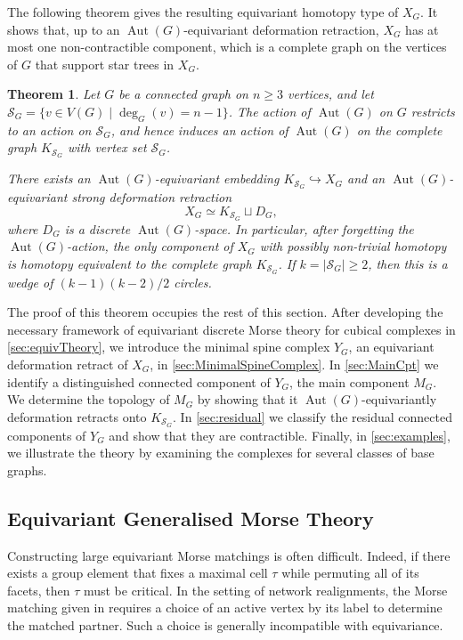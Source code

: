 \documentclass[reqno,dvipsnames]{amsart}
\newtheorem{theorem}{Theorem}[section]
\theoremstyle{plain}
\numberwithin{equation}{section}
\theoremstyle{definition}
\DeclareMathOperator{\Aut}{Aut}
\begin{document}
The following theorem gives the resulting equivariant homotopy type of $X_G$. It shows that, up to an $\Aut(G)$-equivariant deformation retraction, $X_G$ has at most one non-contractible component, which is a complete graph on the vertices of $G$ that support star trees in $X_G$.

\begin{theorem} 
	Let $G$ be a connected graph on $n\geq 3$ vertices, and let $\mathcal S_G=\{v\in V(G) \mid \deg_G(v)=n-1\}$. The action of $\Aut(G)$ on $G$ restricts to an action on $\mathcal S_G$, and hence induces an action of $\Aut(G)$ on the complete graph $K_{\mathcal S_G}$ with vertex set $\mathcal S_G$. 
	
	There exists an $\Aut(G)$-equivariant embedding $K_{\mathcal S_G}\hookrightarrow X_G$ and an $\Aut(G)$-equivariant strong deformation retraction 
	\[
	X_G \simeq K_{\mathcal S_G} \sqcup D_G, 
	\]
	where $D_G$ is a discrete $\Aut(G)$-space. In particular, after forgetting the $\Aut(G)$-action, the only component of $X_G$ with possibly non-trivial homotopy is homotopy equivalent to the complete graph $K_{\mathcal S_G}$. If $k=|\mathcal S_G|\geq 2$, then this is a wedge of $(k-1)(k-2)/2$ circles.
\end{theorem}

The proof of this theorem occupies the rest of this section. After developing the necessary framework of equivariant discrete Morse theory for cubical complexes in \autoref{sec:equivTheory}, we introduce the minimal spine complex $Y_G$, an equivariant deformation retract of $X_G$, in \autoref{sec:MinimalSpineComplex}. In \autoref{sec:MainCpt} we identify a distinguished connected component of $Y_G$, the main component $M_G$.  We determine the topology of $M_G$ by showing that it $\Aut(G)$-equivariantly deformation retracts onto $K_{\mathcal S_G}$. In \autoref{sec:residual} we classify the residual connected components of $Y_G$ and show that they are contractible. Finally, in \autoref{sec:examples}, we illustrate the theory by examining the complexes for several classes of base graphs.



\subsection{Equivariant Generalised Morse Theory}\label{sec:equivTheory}

Constructing large equivariant Morse matchings is often difficult. Indeed, if there exists a group element that fixes a maximal cell $\tau$ while permuting all of its facets, then $\tau$ must be critical. In the setting of network realignments, the Morse matching given in \cite{Kozlov25} requires a choice of an active vertex by its label to determine the matched partner. Such a choice is generally incompatible with equivariance. 
\end{document}
